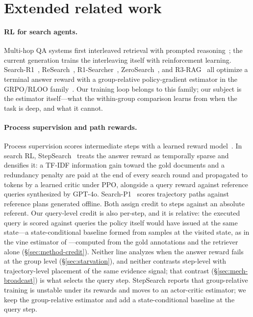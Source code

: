 \section{Extended related work}
\label{app:related}
\paragraph{RL for search agents.} Multi-hop QA systems first
interleaved retrieval with prompted
reasoning~\citep{yao2023react,press2023measuring,trivedi2023interleaving};
the current generation trains the interleaving itself with
reinforcement learning. Search-R1~\citep{jin2025searchr1},
ReSearch~\citep{chen2025research},
R1-Searcher~\citep{song2025r1searcher},
ZeroSearch~\citep{sun2026zerosearch}, and R3-RAG~\citep{li2025r3}
all optimize a terminal answer reward with a group-relative
policy-gradient estimator in the GRPO/RLOO
family~\citep{shao2024deepseekmath,ahmadian2024rloo,kool2019buy}. Our
training loop belongs to this family; our subject is the estimator
itself---what the within-group comparison learns from when the task
is deep, and what it cannot.

\paragraph{Process supervision and path rewards.} Process
supervision scores intermediate steps with a learned reward
model~\citep{lightman2024verify,uesato2022solving}. In search RL,
StepSearch~\citep{zheng-etal-2025-stepsearch} treats the answer
reward as temporally sparse and densifies it: a TF-IDF information
gain toward the gold documents and a redundancy penalty are paid at
the end of every search round and propagated to tokens by a learned
critic under PPO, alongside a query reward against reference queries
synthesized by GPT-4o. Search-P1~\citep{xia2026searchp1} scores
trajectory paths against reference plans generated offline. Both
assign credit to steps against an absolute referent. Our query-level
credit is also per-step, and it is relative: the executed query is
scored against queries the policy itself would have issued at the same
state---a state-conditional baseline formed from samples at the
visited state, as in the vine estimator of
\citet{schulman2015trpo}---computed from the
gold annotations and the retriever alone (\S\ref{sec:method-credit}).
Neither line analyzes when the answer reward fails at the group level
(\S\ref{sec:starvation}), and neither contrasts step-level with
trajectory-level placement of the same evidence signal; that contrast
(\S\ref{sec:mech-broadcast}) is what selects the query step.
StepSearch reports that group-relative training is unstable under its
rewards and moves to an actor-critic estimator; we keep the
group-relative estimator and add a state-conditional baseline at the
query step.

